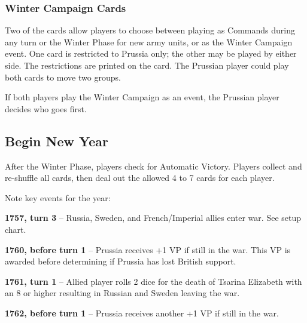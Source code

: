 \subsubsection{Winter Campaign Cards}

Two of the cards allow players to choose between playing as Commands during any turn or the Winter Phase for new army units, or as the Winter Campaign event. One card is restricted to Prussia only; the other may be played by either side. The restrictions are printed on the card. The Prussian player could play both cards to move two groups.

If both players play the Winter Campaign as an event, the Prussian player decides who goes first.

\subsection{Begin New Year}
After the Winter Phase, players check for Automatic Victory. Players collect and re-shuffle all cards, then deal out the allowed 4 to 7 cards for each player.

Note key events for the year:

\textbf{1757, turn 3} – Russia, Sweden, and French/Imperial allies enter war. See setup chart.

\textbf{1760, before turn 1} – Prussia receives +1 VP if still in the war. This VP is awarded before determining if Prussia has lost British support.

\textbf{1761, turn 1} – Allied player rolls 2 dice for the death of Tsarina Elizabeth with an 8 or higher resulting in Russian and Sweden leaving the war.

\textbf{1762, before turn 1} – Prussia receives another +1 VP if still in the war.
